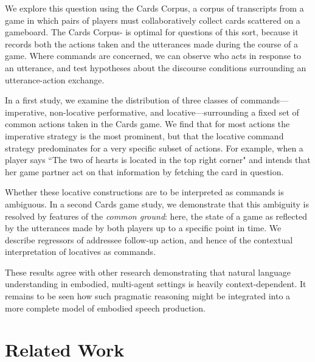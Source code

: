 \documentclass[11pt,a4paper]{article}
\begin{document}
We explore this question using the Cards Corpus, a corpus of transcripts from a game in which pairs of players must collaboratively collect cards scattered on a gameboard. The Cards Corpus- is optimal for questions of this sort, because it records both the actions taken and the utterances made during the course of a game. Where commands are concerned, we can observe who acts in response to an utterance, and test hypotheses about the discourse conditions surrounding an utterance-action exchange.

In a first study, we examine the distribution of three classes of commands---imperative, non-locative performative, and locative---surrounding a fixed set of common actions taken in the Cards game. We find that for most actions the imperative strategy 
is the most prominent, but that the locative command strategy predominates for a very specific subset of actions. For example, when a player says ``The two of hearts is located in the top right corner" and intends that her game partner act on that information by fetching the card in question.

Whether these locative constructions are to be interpreted as commands is ambiguous. In a second Cards game study, we demonstrate that this ambiguity is resolved by features of the \textit{common ground}: here, the state of a game as reflected by the utterances made by both players up to a specific point in time. We describe regressors of addressee follow-up action, and hence of the contextual interpretation of locatives as commands.

These results agree with other research demonstrating that natural language understanding in embodied, multi-agent settings is heavily context-dependent. 
It remains to be seen how such pragmatic reasoning might be integrated into a more complete model of embodied speech production.

\section{Related Work}
\end{document}

